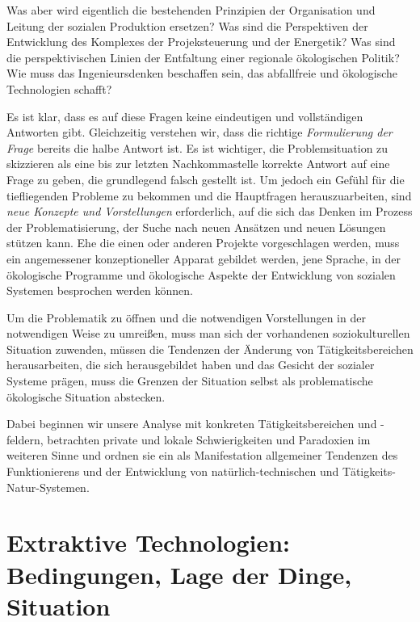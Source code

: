 \documentclass[11pt,a4paper]{article}
\begin{document}
Was aber wird eigentlich die bestehenden Prinzipien der Organisation und
Leitung der sozialen Produktion ersetzen? Was sind die Perspektiven der
Entwicklung des Komplexes der Projeksteuerung und der Energetik? Was sind die
perspektivischen Linien der Entfaltung einer regionale ökologischen Politik?
Wie muss das Ingenieursdenken beschaffen sein, das abfallfreie und ökologische
Technologien schafft?

Es ist klar, dass es auf diese Fragen keine eindeutigen und vollständigen
Antworten gibt.  Gleichzeitig verstehen wir, dass die richtige
\emph{Formulierung der Frage} bereits die halbe Antwort ist.  Es ist
wichtiger, die Problemsituation zu skizzieren als eine bis zur letzten
Nachkommastelle korrekte Antwort auf eine Frage zu geben, die grundlegend
falsch gestellt ist. Um jedoch ein Gefühl für die tiefliegenden Probleme zu
bekommen und die Hauptfragen herauszuarbeiten, sind \emph{neue Konzepte und
  Vorstellungen} erforderlich, auf die sich das Denken im Prozess der
Problematisierung, der Suche nach neuen Ansätzen und neuen Lösungen stützen
kann.  Ehe die einen oder anderen Projekte vorgeschlagen werden, muss ein
angemessener konzeptioneller Apparat gebildet werden, jene Sprache, in der
ökologische Programme und ökologische Aspekte der Entwicklung von sozialen
Systemen besprochen werden können.

Um die Problematik zu öffnen und die notwendigen Vorstellungen in der
notwendigen Weise zu umreißen, muss man sich der vorhandenen soziokulturellen
Situation zuwenden, müssen die Tendenzen der Änderung von Tätigkeitsbereichen
herausarbeiten, die sich herausgebildet haben und das Gesicht der sozialer
Systeme prägen, muss die Grenzen der Situation selbst als problematische
ökologische Situation abstecken.

Dabei beginnen wir unsere Analyse mit konkreten Tätigkeitsbereichen und
-feldern, betrachten private und lokale Schwierigkeiten und Paradoxien im
weiteren Sinne und ordnen sie ein als Manifestation allgemeiner Tendenzen des
Funktionierens und der Entwicklung von natürlich-technischen und
Tätigkeits-Natur-Systemen.

\section{Extraktive Technologien: Bedingungen, Lage der Dinge, Situation}
\end{document}
